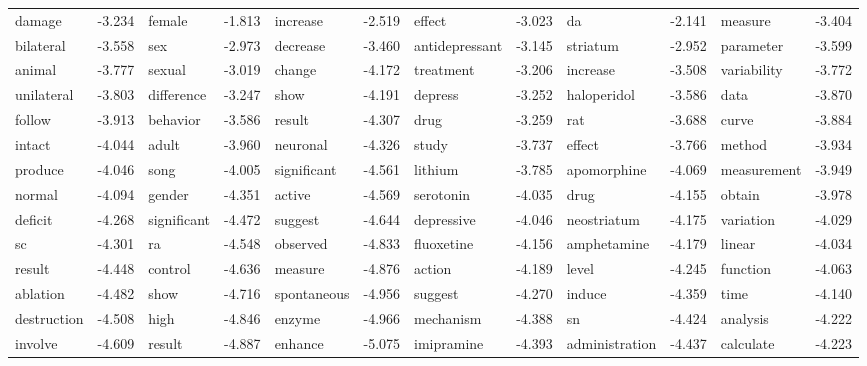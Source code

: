 \documentclass{article}
\begin{document}
\begin{table}
{\begin{tabular}{|l r|l r|l r|l r|l r|l r|}
damage & -3.234 & female & -1.813 & increase & -2.519 & effect & -3.023 & da & -2.141 & measure & -3.404\\
bilateral & -3.558 & sex & -2.973 & decrease & -3.460 & antidepressant & -3.145 & striatum & -2.952 & parameter & -3.599\\
animal & -3.777 & sexual & -3.019 & change & -4.172 & treatment & -3.206 & increase & -3.508 & variability & -3.772\\
unilateral & -3.803 & difference & -3.247 & show & -4.191 & depress & -3.252 & haloperidol & -3.586 & data & -3.870\\
follow & -3.913 & behavior & -3.586 & result & -4.307 & drug & -3.259 & rat & -3.688 & curve & -3.884\\
intact & -4.044 & adult & -3.960 & neuronal & -4.326 & study & -3.737 & effect & -3.766 & method & -3.934\\
produce & -4.046 & song & -4.005 & significant & -4.561 & lithium & -3.785 & apomorphine & -4.069 & measurement & -3.949\\
normal & -4.094 & gender & -4.351 & active & -4.569 & serotonin & -4.035 & drug & -4.155 & obtain & -3.978\\
deficit & -4.268 & significant & -4.472 & suggest & -4.644 & depressive & -4.046 & neostriatum & -4.175 & variation & -4.029\\
sc & -4.301 & ra & -4.548 & observed & -4.833 & fluoxetine & -4.156 & amphetamine & -4.179 & linear & -4.034\\
result & -4.448 & control & -4.636 & measure & -4.876 & action & -4.189 & level & -4.245 & function & -4.063\\
ablation & -4.482 & show & -4.716 & spontaneous & -4.956 & suggest & -4.270 & induce & -4.359 & time & -4.140\\
destruction & -4.508 & high & -4.846 & enzyme & -4.966 & mechanism & -4.388 & sn & -4.424 & analysis & -4.222\\
involve & -4.609 & result & -4.887 & enhance & -5.075 & imipramine & -4.393 & administration & -4.437 & calculate & -4.223\\
\hline
\end{tabular}
}
\end{table}
\end{document}

